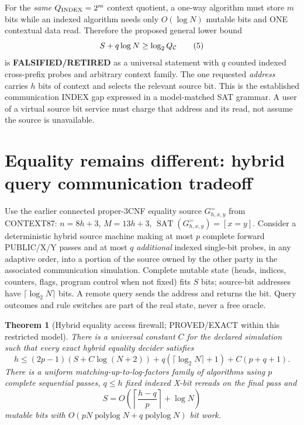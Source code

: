 \documentclass[11pt]{article}
\newtheorem{theorem}{Theorem}
\newcommand{\SAT}{\operatorname{SAT}}
\begin{document}
For the \emph{same} $Q_{\rm INDEX}=2^m$ context quotient, a one-way algorithm must store $m$ bits while an indexed algorithm needs only $O(\log N)$ mutable bits and ONE contextual data read. Therefore the proposed general lower bound
\[
 S+q\log N\ge\log_2 Q_{\cal C}
\tag{5}
\]
is \textbf{FALSIFIED/RETIRED} as a universal statement with $q$ counted indexed cross-prefix probes and arbitrary context family. The one requested \emph{address} carries $h$ bits of context and selects the relevant source bit. This is the established communication INDEX gap expressed in a model-matched SAT grammar. A user of a virtual source bit service must charge that address and its read, not assume the source is unavailable.

\section{Equality remains different: hybrid query communication tradeoff}
Use the earlier connected proper-3CNF equality source $G^=_{h,x,y}$ from CONTEXT87: $n=8h+3$, $M=13h+3$, $\SAT(G^=_{h,x,y})=[x=y]$. Consider a deterministic hybrid source machine making at most $p$ complete forward PUBLIC/X/Y passes and at most $q$ \emph{additional} indexed single-bit probes, in any adaptive order, into a portion of the source owned by the other party in the associated communication simulation. Complete mutable state (heads, indices, counters, flags, program control when not fixed) fits $S$ bits; source-bit addresses have $\lceil\log_2 N\rceil$ bits. A remote query sends the address and returns the bit. Query outcomes and rule switches are part of the real state, never a free oracle.
\begin{theorem}[Hybrid equality access firewall; PROVED/EXACT within this restricted model]
There is a universal constant $C$ for the declared simulation such that every exact hybrid equality decider satisfies
\[
\boxed{
 h \le (2p-1)(S+C\log(N+2))
       +q(\lceil\log_2N\rceil+1)+C(p+q+1).
}\tag{6}
\]
There is a uniform matching-up-to-log-factors family of algorithms using $p$ complete sequential passes, $q\le h$ fixed indexed X-bit rereads on the final pass and
\[
S=O\!\left(\left\lceil\frac{h-q}{p}\right\rceil+\log N\right)
\]
mutable bits with $O(pN\operatorname{polylog}N+q\operatorname{polylog}N)$ bit work.
\end{theorem}
\end{document}
